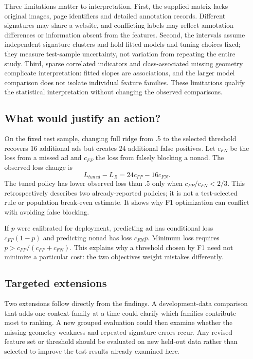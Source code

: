 \documentclass[11pt,a4paper]{article}
\begin{document}
Three limitations matter to interpretation. First, the supplied matrix lacks original images, page identifiers and detailed annotation records. Different signatures may share a website, and conflicting labels may reflect annotation differences or information absent from the features. Second, the intervals assume independent signature clusters and hold fitted models and tuning choices fixed; they measure test-sample uncertainty, not variation from repeating the entire study. Third, sparse correlated indicators and class-associated missing geometry complicate interpretation: fitted slopes are associations, and the larger model comparison does not isolate individual feature families. These limitations qualify the statistical interpretation without changing the observed comparisons.

\subsection{What would justify an action?}
On the fixed test sample, changing full ridge from .5 to the selected threshold recovers 16 additional ads but creates 24 additional false positives. Let $c_{FN}$ be the loss from a missed ad and $c_{FP}$ the loss from falsely blocking a nonad. The observed loss change is
\[L_{tuned}-L_{.5}=24c_{FP}-16c_{FN}.\]
The tuned policy has lower observed loss than .5 only when $c_{FP}/c_{FN}<2/3$. This retrospectively describes two already-reported policies; it is not a test-selected rule or population break-even estimate. It shows why F1 optimization can conflict with avoiding false blocking.

If $p$ were calibrated for deployment, predicting ad has conditional loss $c_{FP}(1-p)$ and predicting nonad has loss $c_{FN}p$. Minimum loss requires $p>c_{FP}/(c_{FP}+c_{FN})$. This explains why a threshold chosen by F1 need not minimize a particular cost: the two objectives weight mistakes differently.

\subsection{Targeted extensions}
Two extensions follow directly from the findings. A development-data comparison that adds one context family at a time could clarify which families contribute most to ranking. A new grouped evaluation could then examine whether the missing-geometry weakness and repeated-signature errors recur. Any revised feature set or threshold should be evaluated on new held-out data rather than selected to improve the test results already examined here.
\end{document}

